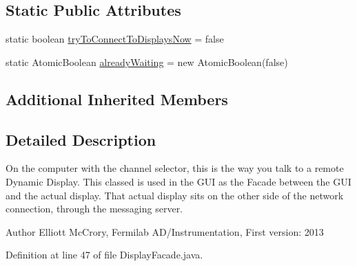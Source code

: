 \subsection*{Static Public Attributes}
\begin{DoxyCompactItemize}
\item 
static boolean \hyperlink{classgov_1_1fnal_1_1ppd_1_1dd_1_1display_1_1DisplayFacade_a0e46150fb1f40a87bac5060ea85c6dcc}{try\-To\-Connect\-To\-Displays\-Now} = false
\item 
static Atomic\-Boolean \hyperlink{classgov_1_1fnal_1_1ppd_1_1dd_1_1display_1_1DisplayFacade_a385e34731c409e71b2cea39b88b7e918}{already\-Waiting} = new Atomic\-Boolean(false)
\end{DoxyCompactItemize}
\subsection*{Additional Inherited Members}


\subsection{Detailed Description}
On the computer with the channel selector, this is the way you talk to a remote Dynamic Display. This classed is used in the G\-U\-I as the Facade between the G\-U\-I and the actual display. That actual display sits on the other side of the network connection, through the messaging server.

\begin{DoxyAuthor}{Author}
Elliott Mc\-Crory, Fermilab A\-D/\-Instrumentation, First version\-: 2013 
\end{DoxyAuthor}


Definition at line 47 of file Display\-Facade.\-java.




